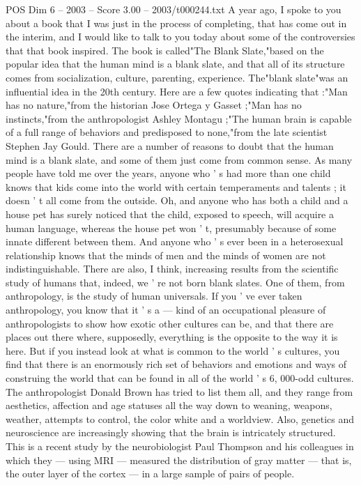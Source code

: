\begin{textsample}{POS Dim 6 – 2003 – Score 3.00 – 2003/t000244.txt}  \label{ex:f6_pos_021}
A year ago, I spoke to you about a book that I was just in the process of completing, that has come out in the interim, and I would like to talk to you today about some of the controversies that that book inspired.
The book is called"The Blank Slate,"based on the popular idea that the human mind is a blank slate, and that all of its structure comes from socialization, culture, parenting, experience.
The"blank slate"was an influential idea in the 20th century.
Here are a few quotes indicating that :"Man has no nature,"from the historian Jose Ortega y Gasset ;"Man has no instincts,"from the anthropologist Ashley Montagu ;"The human brain is capable of a full range of behaviors and predisposed to none,"from the late scientist Stephen Jay Gould.
There are a number of reasons to doubt that the human mind is a blank slate, and some of them just come from common sense.
As many people have told me over the years, anyone who ' s had more than one child knows that kids come into the world with certain temperaments and talents ; it doesn ' t all come from the outside.
Oh, and anyone who has both a child and a house pet has surely noticed that the child, exposed to speech, will acquire a human language, whereas the house pet won ' t, presumably because of some innate different between them.
And anyone who ' s ever been in a heterosexual relationship knows that the minds of men and the minds of women are not indistinguishable.
There are also, I think, increasing results from the scientific study of humans that, indeed, we ' re not born blank slates.
One of them, from anthropology, is the study of human universals.
If you ' ve ever taken anthropology, you know that it ' s a — kind of an occupational pleasure of anthropologists to show how exotic other cultures can be, and that there are places out there where, supposedly, everything is the opposite to the way it is here.
But if you instead look at what is common to the world ' s cultures, you find that there is an enormously rich set of behaviors and emotions and ways of construing the world that can be found in all of the world ' s 6, 000-odd cultures.
The anthropologist Donald Brown has tried to list them all, and they range from aesthetics, affection and age statuses all the way down to weaning, weapons, weather, attempts to control, the color white and a worldview.
Also, genetics and neuroscience are increasingly showing that the brain is intricately structured.
This is a recent study by the neurobiologist Paul Thompson and his colleagues in which they — using MRI — measured the distribution of gray matter — that is, the outer layer of the cortex — in a large sample of pairs of people.

\end{textsample}

